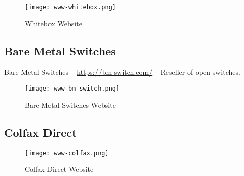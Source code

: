 \begin{figure}[h!]
\texttt{[image: www-whitebox.png]}
 \caption{Whitebox Website}
 \label{fig:www-whitebox}
\end{figure}


\subsection{Bare Metal Switches}
Bare Metal Switches -- \url{https://bm-switch.com/} -- Reseller of open switches.

\begin{figure}[h!]
\texttt{[image: www-bm-switch.png]}
 \caption{Bare Metal Switches Website}
 \label{fig:www-bm-switch}
\end{figure}

\subsection{Colfax Direct}


\begin{figure}[h!]
\texttt{[image: www-colfax.png]}
 \caption{Colfax Direct Website}
 \label{fig:www-colfax}
\end{figure}

